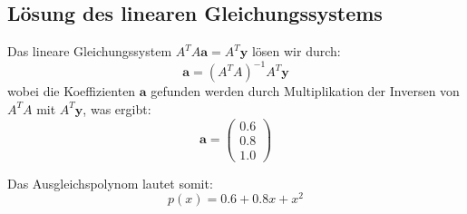 \subsection*{Lösung des linearen Gleichungssystems}
Das lineare Gleichungssystem \( A^T A \mathbf{a} = A^T \mathbf{y} \) lösen wir durch:
\[
\mathbf{a} = (A^T A)^{-1} A^T \mathbf{y}
\]
wobei die Koeffizienten \(\mathbf{a}\) gefunden werden durch Multiplikation der Inversen von \(A^T A\) mit \(A^T \mathbf{y}\), was ergibt:
\[
\mathbf{a} = \begin{pmatrix}
0.6 \\
0.8 \\
1.0
\end{pmatrix}
\]

Das Ausgleichspolynom lautet somit:
\[
p(x) = 0.6 + 0.8x + x^2
\]
